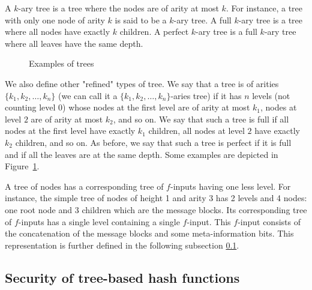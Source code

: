 \documentclass{llncs}
\begin{document}
A $k$-ary tree is a tree where the nodes are of arity at most $k$. For instance, a tree with only one node of arity $k$ is said to be a $k$-ary tree. 
A full $k$-ary tree is a tree where all nodes have exactly $k$ children.
A perfect $k$-ary tree is a full $k$-ary tree where all leaves have the same depth.

\begin{figure}[htb]
\centering
{}
\vspace{0.75cm}

\vspace{0.75cm}

\caption{Examples of trees}
\label{Tree_examples}
\end{figure}


\begin{sloppypar}
We also define other "refined" types of tree. 
We say that a tree is of arities $\{k_1,k_2, \ldots, k_n\}$ (we can call it a $\{k_1,k_2, \ldots, k_n\}$-aries tree) if 
it has $n$ levels (not counting level $0$) whose nodes at the first level are
of arity at most $k_1$, nodes at level $2$ are of arity at most $k_2$, and so on. We say that such a tree is full 
if all nodes at the first level have exactly $k_1$ children, all nodes at level $2$ have exactly $k_2$ children, and so on. 
As before, we say that such a tree is perfect if it is full and if all the leaves are at the same depth.
Some examples are depicted in Figure~\ref{Tree_examples}.
\end{sloppypar}

A tree of nodes has a corresponding tree of $f$-inputs having one less level. For instance, the simple tree of nodes of height 1 and arity 3 has 2 levels and 4 nodes: 
one root node and 3 children which are the message blocks. Its corresponding tree of $f$-inputs has a single level containing a single $f$-input. This $f$-input consists
of the concatenation of the message blocks and some meta-information bits. This representation is further defined in the following subsection \ref{three_conditions}.

\subsection{Security of tree-based hash functions}\label{three_conditions}
\end{document}
